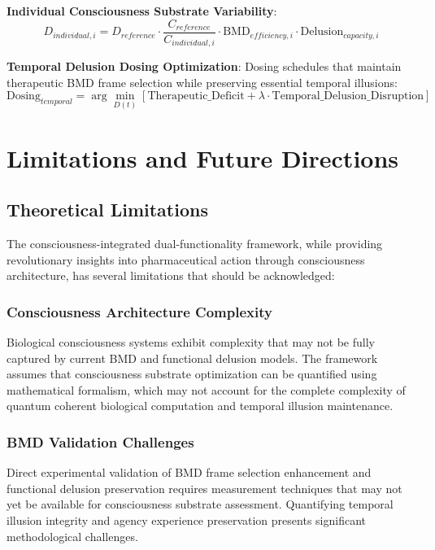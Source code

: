 \documentclass[12pt,a4paper]{article}
\begin{document}
\textbf{Individual Consciousness Substrate Variability}:
$$D_{individual,i} = D_{reference} \cdot \frac{C_{reference}}{C_{individual,i}} \cdot \text{BMD}_{efficiency,i} \cdot \text{Delusion}_{capacity,i}$$

\textbf{Temporal Delusion Dosing Optimization}:
Dosing schedules that maintain therapeutic BMD frame selection while preserving essential temporal illusions:
$$\text{Dosing}_{temporal} = \arg\min_{D(t)} \left[\text{Therapeutic\_Deficit} + \lambda \cdot \text{Temporal\_Delusion\_Disruption}\right]$$

\section{Limitations and Future Directions}

\subsection{Theoretical Limitations}

The consciousness-integrated dual-functionality framework, while providing revolutionary insights into pharmaceutical action through consciousness architecture, has several limitations that should be acknowledged:

\subsubsection{Consciousness Architecture Complexity}

Biological consciousness systems exhibit complexity that may not be fully captured by current BMD and functional delusion models. The framework assumes that consciousness substrate optimization can be quantified using mathematical formalism, which may not account for the complete complexity of quantum coherent biological computation and temporal illusion maintenance.

\subsubsection{BMD Validation Challenges}

Direct experimental validation of BMD frame selection enhancement and functional delusion preservation requires measurement techniques that may not yet be available for consciousness substrate assessment. Quantifying temporal illusion integrity and agency experience preservation presents significant methodological challenges.
\end{document}
